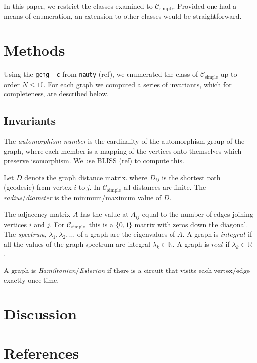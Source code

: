 \documentclass[12pt]{article}
\begin{document}
In this paper, we restrict the classes examined to $\mathcal{C}_\text{simple}$.
Provided one had a means of enumeration, an extension to other classes would be straightforward.

\section{Methods}
Using the \texttt{geng -c} from \texttt{nauty} (ref), we enumerated the class of $\mathcal{C}_\text{simple}$ up to order $N \le 10$.
For each graph we computed a series of invariants, which for completeness, are described below.

\subsection{Invariants}

The \textit{automorphism number} is the cardinality of the automorphism group of the graph, where each member is a mapping of the vertices onto themselves which preserve isomorphism. We use BLISS (ref) to compute this.

Let $D$ denote the graph distance matrix, where $D_{ij}$ is the shortest path (geodesic) from vertex $i$ to $j$.
In $\mathcal{C}_\text{simple}$ all distances are finite.
The \textit{radius}/\textit{diameter} is the minimum/maximum value of $D$.

The adjacency matrix $A$ has the value at $A_{ij}$ equal to the number of edges joining vertices $i$ and $j$.
For $\mathcal{C}_\text{simple}$, this is a $\{0,1\}$ matrix with zeros down the diagonal.
The \textit{spectrum}, $\lambda_1, \lambda_2, \ldots$ of a graph are the eigenvalues of $A$.
A graph is $integral$ if all the values of the graph spectrum are integral $\lambda_k \in \mathbb{N}$.
A graph is $real$ if $\lambda_k \in \mathbb{R}$.

A graph is \textit{Hamiltonian}/\textit{Eulerian} if there is a circuit that visits each vertex/edge exactly once time.

\section{Discussion}


\section{References}
\end{document}
